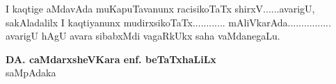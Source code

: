 I kaqtige aMdavAda muKapuTavanunx racisikoTaTx shirxV......avarigU, sakAladalilx I kaqtiyanunx mudirxsikoTaTx............ mAliVkarAda................ avarigU hAgU avara sibabxMdi vagaRkUkx saha vaMdanegaLu.

\begin{flushright}
{\bf DA. caMdarxsheVKara enf. beTaTxhaLiLx}\\[3pt]
saMpAdaka\qquad\qquad\,
\end{flushright}

\newpage
\thispagestyle{empty}
~\phantom{a}

\newpage
